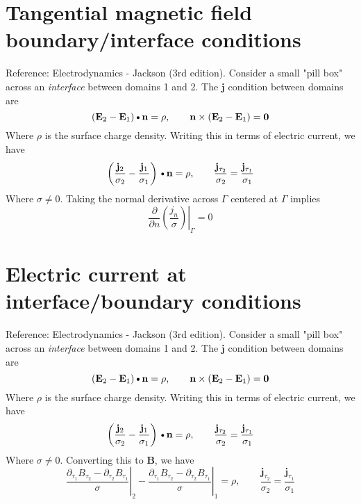 \documentclass[11pt]{article}
\newcommand{\B}{\mathbf{B}}
\newcommand{\PD}{\partial}
\newcommand{\J}{\mathbf{j}}
\newcommand{\E}{\mathbf{E}}
\newcommand{\N}{\mathbf{n}}
\newcommand{\DOT}{\text{\textbullet}}
\begin{document}
\section{Tangential magnetic field boundary/interface conditions}
Reference: Electrodynamics - Jackson (3rd edition). Consider a small "pill box" across an \textit{interface} between domains 1 and 2. The $\J$ condition between domains are
\begin{equation}
    (\E_2 - \E_1) \DOT \N = \rho
    , \qquad
    \N \times (\E_2 - \E_1) = \mathbf{0}
\end{equation}
Where $\rho$ is the surface charge density. Writing this in terms of electric current, we have
\begin{equation}
    \left( \frac{\J_2}{\sigma_2} - \frac{\J_1}{\sigma_1} \right) \DOT \N = \rho
    , \qquad
    \frac{\J_{\tau_2}}{\sigma_2} = \frac{\J_{\tau_1}}{\sigma_1}
\end{equation}
Where $\sigma \ne 0$. Taking the normal derivative across $\Gamma$ centered at $\Gamma$ implies
\begin{equation}
  \left. \frac{\PD}{\PD n} \left( \frac{j_n}{\sigma} \right) \right|_{\Gamma} = 0
\end{equation}


\section{Electric current at interface/boundary conditions}
Reference: Electrodynamics - Jackson (3rd edition). Consider a small "pill box" across an \textit{interface} between domains 1 and 2. The $\J$ condition between domains are
\begin{equation}
    (\E_2 - \E_1) \DOT \N = \rho
    , \qquad
    \N \times (\E_2 - \E_1) = \mathbf{0}
\end{equation}
Where $\rho$ is the surface charge density. Writing this in terms of electric current, we have
\begin{equation}
    \left( \frac{\J_2}{\sigma_2} - \frac{\J_1}{\sigma_1} \right) \DOT \N = \rho
    , \qquad
    \frac{\J_{\tau_2}}{\sigma_2} = \frac{\J_{\tau_1}}{\sigma_1}
\end{equation}
Where $\sigma \ne 0$.
Converting this to $\B$, we have
\begin{equation}
    \left.
    \frac{\PD_{\tau_1} B_{\tau_2} - \PD_{\tau_2} B_{\tau_1}}
    {\sigma}
    \right |_{2} - 
    \left.
    \frac{\PD_{\tau_1} B_{\tau_2} - \PD_{\tau_2} B_{\tau_1}}
    {\sigma}
    \right |_{1}
    = \rho
    , \qquad
    \frac{\J_{\tau_2}}{\sigma_2} = \frac{\J_{\tau_1}}{\sigma_1}
\end{equation}
\end{document}
